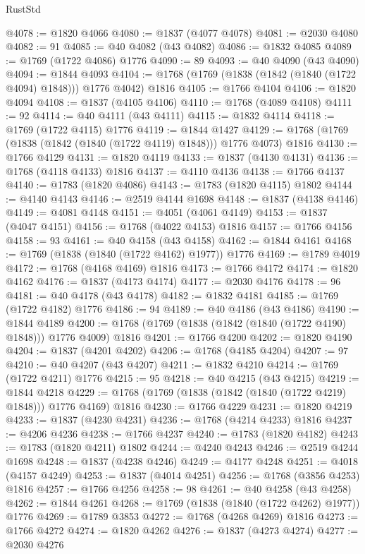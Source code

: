 \begin{lexlean}{RustStd}
\begin{coremodule}
@4078 := @1820 @4066
@4080 := @1837 (@4077 @4078)
@4081 := @2030 @4080
@4082 := 91
@4085 := @40 @4082 (@43 @4082)
@4086 := @1832 @4085
@4089 := @1769 (@1722 @4086) @1776
@4090 := 89
@4093 := @40 @4090 (@43 @4090)
@4094 := @1844 @4093
@4104 := @1768 (@1769 (@1838 (@1842 (@1840 (@1722 @4094) @1848))) @1776 @4042) @1816
@4105 := @1766 @4104
@4106 := @1820 @4094
@4108 := @1837 (@4105 @4106)
@4110 := @1768 (@4089 @4108)
@4111 := 92
@4114 := @40 @4111 (@43 @4111)
@4115 := @1832 @4114
@4118 := @1769 (@1722 @4115) @1776
@4119 := @1844 @1427
@4129 := @1768 (@1769 (@1838 (@1842 (@1840 (@1722 @4119) @1848))) @1776 @4073) @1816
@4130 := @1766 @4129
@4131 := @1820 @4119
@4133 := @1837 (@4130 @4131)
@4136 := @1768 (@4118 @4133) @1816
@4137 := @4110 @4136
@4138 := @1766 @4137
@4140 := @1783 (@1820 @4086)
@4143 := @1783 (@1820 @4115) @1802
@4144 := @4140 @4143
@4146 := @2519 @4144 @1698
@4148 := @1837 (@4138 @4146)
@4149 := @4081 @4148
@4151 := @4051 (@4061 @4149)
@4153 := @1837 (@4047 @4151)
@4156 := @1768 (@4022 @4153) @1816
@4157 := @1766 @4156
@4158 := 93
@4161 := @40 @4158 (@43 @4158)
@4162 := @1844 @4161
@4168 := @1769 (@1838 (@1840 (@1722 @4162) @1977)) @1776
@4169 := @1789 @4019
@4172 := @1768 (@4168 @4169) @1816
@4173 := @1766 @4172
@4174 := @1820 @4162
@4176 := @1837 (@4173 @4174)
@4177 := @2030 @4176
@4178 := 96
@4181 := @40 @4178 (@43 @4178)
@4182 := @1832 @4181
@4185 := @1769 (@1722 @4182) @1776
@4186 := 94
@4189 := @40 @4186 (@43 @4186)
@4190 := @1844 @4189
@4200 := @1768 (@1769 (@1838 (@1842 (@1840 (@1722 @4190) @1848))) @1776 @4009) @1816
@4201 := @1766 @4200
@4202 := @1820 @4190
@4204 := @1837 (@4201 @4202)
@4206 := @1768 (@4185 @4204)
@4207 := 97
@4210 := @40 @4207 (@43 @4207)
@4211 := @1832 @4210
@4214 := @1769 (@1722 @4211) @1776
@4215 := 95
@4218 := @40 @4215 (@43 @4215)
@4219 := @1844 @4218
@4229 := @1768 (@1769 (@1838 (@1842 (@1840 (@1722 @4219) @1848))) @1776 @4169) @1816
@4230 := @1766 @4229
@4231 := @1820 @4219
@4233 := @1837 (@4230 @4231)
@4236 := @1768 (@4214 @4233) @1816
@4237 := @4206 @4236
@4238 := @1766 @4237
@4240 := @1783 (@1820 @4182)
@4243 := @1783 (@1820 @4211) @1802
@4244 := @4240 @4243
@4246 := @2519 @4244 @1698
@4248 := @1837 (@4238 @4246)
@4249 := @4177 @4248
@4251 := @4018 (@4157 @4249)
@4253 := @1837 (@4014 @4251)
@4256 := @1768 (@3856 @4253) @1816
@4257 := @1766 @4256
@4258 := 98
@4261 := @40 @4258 (@43 @4258)
@4262 := @1844 @4261
@4268 := @1769 (@1838 (@1840 (@1722 @4262) @1977)) @1776
@4269 := @1789 @3853
@4272 := @1768 (@4268 @4269) @1816
@4273 := @1766 @4272
@4274 := @1820 @4262
@4276 := @1837 (@4273 @4274)
@4277 := @2030 @4276

\end{coremodule}
\end{lexlean}
